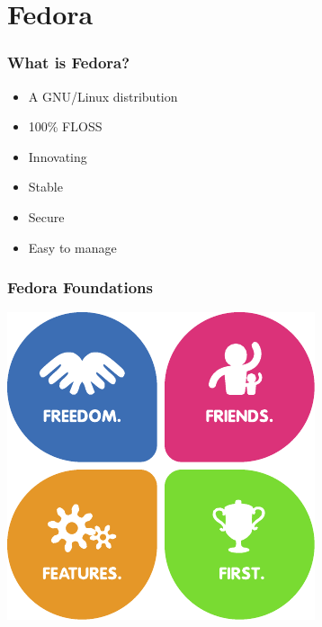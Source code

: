 \documentclass[t,aspectratio=169]{beamer}
\begin{document}
\section{Fedora}
\begin{frame}
    \frametitle{What is Fedora?}
    \begin{itemize}
        \item<2-> A GNU/Linux distribution
        \item<3-> 100\% FLOSS
        \item<4-> Innovating
        \item<5-> Stable
        \item<6-> Secure
        \item<7-> Easy to manage
    \end{itemize}
\end{frame}

\begin{frame}
    \frametitle{Fedora Foundations}
    \begin{center}
        \includegraphics{foundations_all.pdf}
    \end{center}
\end{frame}
\end{document}
